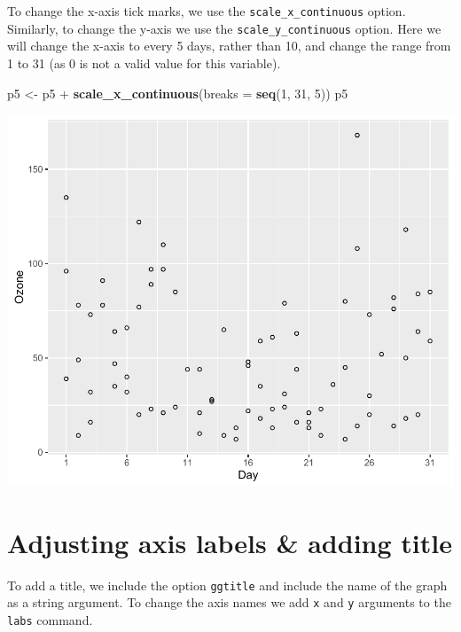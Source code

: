 \documentclass[]{article}
\newenvironment{Shaded}{\begin{snugshade}}{\end{snugshade}}
\newcommand{\KeywordTok}[1]{\textcolor[rgb]{0.13,0.29,0.53}{\textbf{{#1}}}}
\newcommand{\DataTypeTok}[1]{\textcolor[rgb]{0.13,0.29,0.53}{{#1}}}
\newcommand{\DecValTok}[1]{\textcolor[rgb]{0.00,0.00,0.81}{{#1}}}
\newcommand{\StringTok}[1]{\textcolor[rgb]{0.31,0.60,0.02}{{#1}}}
\newcommand{\NormalTok}[1]{{#1}}
\begin{document}
To change the x-axis tick marks, we use the
\texttt{scale\_x\_continuous} option. Similarly, to change the y-axis we
use the \texttt{scale\_y\_continuous} option. Here we will change the
x-axis to every 5 days, rather than 10, and change the range from 1 to
31 (as 0 is not a valid value for this variable).

\begin{Shaded}
\begin{Highlighting}[]
\NormalTok{p5 <-}\StringTok{ }\NormalTok{p5 +}\StringTok{ }\KeywordTok{scale_x_continuous}\NormalTok{(}\DataTypeTok{breaks =} \KeywordTok{seq}\NormalTok{(}\DecValTok{1}\NormalTok{, }\DecValTok{31}\NormalTok{, }\DecValTok{5}\NormalTok{))}
\NormalTok{p5}
\end{Highlighting}
\end{Shaded}

\begin{center}\includegraphics{5_Scatter_Plots_pdf/scatter_3-1} \end{center}

\section{Adjusting axis labels \& adding
title}\label{adjusting-axis-labels-adding-title}

To add a title, we include the option \texttt{ggtitle} and include the
name of the graph as a string argument. To change the axis names we add
\texttt{x} and \texttt{y} arguments to the \texttt{labs} command.
\end{document}
